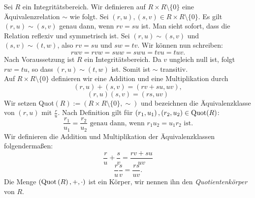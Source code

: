 
\begin{satz}\label{quotkoerper} %
Sei $R$ ein Integritätsbereich. Wir definieren auf $R\times R\setminus\lbrace 0\rbrace$ eine Äquivalenzrelation $\sim$ wie folgt. Sei $\left(r, u\right), \left(s, v\right) \in R\times R\setminus\lbrace 0\rbrace$. Es gilt $\left(r,u\right) \sim \left(s, v\right)$ genau dann, wenn $rv = su$ ist. Man sieht sofort, dass die Relation reflexiv und symmetrisch ist. Sei $\left(r,u\right) \sim \left(s, v\right)$ und $ \left(s, v\right) \sim \left(t, w\right) $, also $rv = su$ und $sw = tv$. Wir können nun schreiben: \\
\[rwv = rvw = suw = swu = tvu = tuv.\]
Nach Voraussetzung ist $R$ ein Integritätsbereich. Da $v$ ungleich null ist, folgt $rw = tu$, so dass $\left(r,u \right) \sim \left(t, w\right)$ ist. Somit ist $\sim$ transitiv. \\
Auf $R\times R\setminus \lbrace 0\rbrace$ definieren wir eine Addition und eine Multiplikation durch 
\[\left(r,u\right)+ \left(s,v\right) = \left(rv + su, uv\right),\]
\[\left(r,u\right)\left(s,v\right) = \left(rs, uv\right)\] 
Wir setzen \textup{Quot}$(R) := \left(R\times R\setminus\lbrace 0\rbrace , \sim\right)$ und bezeichnen die Äquivalenzklasse von $(r,u) $ mit $\frac{r}{u}$. Nach Definition gilt für $\left(r_1, u_1\right), \left(r_2, u_2\right) \in \textup{Quot}(R)$:
\[ \frac{r_1}{u_1} = \frac{r_2}{u_2} \text{ genau dann, wenn } r_1u_2 = u_1r_2 \text{ ist.}
\]
Wir definieren die Addition und Multiplikation der Äquivalenzklassen folgendermaßen: 
\[\frac{r}{u} + \frac{s}{v} = \frac{rv + su}{uv}\]
\[\frac{r}{u}\frac{s}{v} = \frac{rs}{uv}.\]
Die Menge $\left(\textup{Quot}\left(R\right), +, \cdot\right)$ ist ein Körper, wir nennen ihn den \textit{Quotientenkörper} von $R$.
\end{satz}
